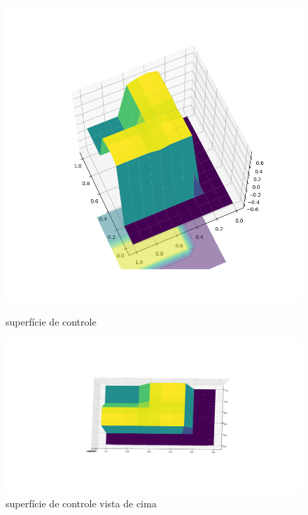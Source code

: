 \documentclass[
	12pt,				%
	openright,			%
	oneside,			%
	a4paper,			%
	brazil,				%
	]{abntex2}
\begin{document}
\begin{figure}[H]
 \includegraphics[width = 1\textwidth]{Imagens/Surface_Control.png}
	 \caption{superfície de controle}
	 \label{surface_control}
	 
	 \includegraphics[width = 1\textwidth]{Imagens/Surface_Control2.png}
	 \caption{superfície de controle vista de cima }
	 \label{surface_control2}
\end{figure}
\end{document}
